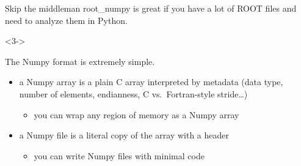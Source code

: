 \documentclass{beamer}
\begin{document}
\begin{frame}{Skip the middleman}
\vspace{0.25 cm}
root\_numpy is great if you have a lot of ROOT files and need to analyze them in Python.

\vspace{0.25 cm}

\begin{uncoverenv}<3->
\vspace{0.25 cm}
\begin{block}{The Numpy format is extremely simple.}
\begin{itemize}\setlength{\itemsep}{0.25 cm}
\item<4-> a Numpy array is a plain C array interpreted by metadata {\small (data type,} {\footnotesize number of elements,} {\scriptsize endianness,} {\tiny C vs.\ Fortran-style stride\ldots)}
\begin{itemize}
\item you can wrap any region of memory as a Numpy array
\end{itemize}

\item<5-> a Numpy file is a literal copy of the array with a header
\begin{itemize}
\item you can write Numpy files with minimal code
\end{itemize}

\end{itemize}
\end{block}
\end{uncoverenv}
\end{frame}
\end{document}
